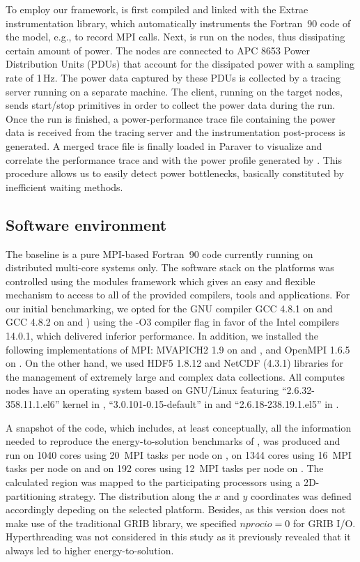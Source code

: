 To employ our framework, \cosmoart is first compiled and linked with the Extrae instrumentation library, which automatically  instruments the Fortran~90 code of the model, e.g., to record MPI calls.  Next, \cosmoart  is  run on  the  nodes,  thus dissipating  certain amount  of power. The  nodes are connected to APC 8653 Power Distribution Units (PDUs)
that account for the dissipated power with a sampling rate of 1\,Hz. The power data captured by these PDUs is collected by a \pmlib tracing server running on a separate machine. The client, running on the target nodes, sends start/stop  primitives in order to collect
the power data during the \cosmoart run. Once  the run  is finished,  a power-performance trace file containing the power data is received from the tracing server and the instrumentation post-process is generated. A merged trace file is finally loaded in Paraver to visualize and correlate the performance trace and with the power profile generated by \cosmoart. This procedure allows us to easily detect power bottlenecks, basically constituted by inefficient waiting methods.

\subsection{Software environment}
\label{subsec:3.2}

The \cosmoart  baseline is a  pure MPI-based  Fortran~90 code
currently  running  on   distributed  multi-core  systems  only.   The
software stack on the platforms was controlled using the modules
framework which gives an easy  and flexible mechanism to access to all
of the  provided compilers, tools  and applications.  For  our initial
benchmarking,   we  opted   for   the  GNU   compiler  GCC 4.8.1   on
\monch and GCC 4.8.2 on  \pilat and \tinto) using the -O3 compiler
flag  in favor  of the  Intel compilers 14.0.1,  which delivered inferior
performance.  In  addition, we installed the following implementations of MPI: MVAPICH2 1.9 on \monch and \pilat, and  OpenMPI 1.6.5 on \tinto. On the other hand, we  used HDF5 1.8.12 and NetCDF  (4.3.1) libraries for  the management  of extremely  large and
complex data collections.  All computes nodes have an operating system
based on GNU/Linux featuring ``2.6.32-358.11.1.el6'' kernel in
\monch, ``3.0.101-0.15-default'' in \pilat and ``2.6.18-238.19.1.el5'' in \tinto.

A snapshot of the code,  which includes, at least conceptually, all the
information needed  to reproduce the  energy-to-solution benchmarks of
\cosmoart, was produced and run on 1040 cores using 20~MPI
tasks  per node on  \monch, on 1344 cores  using 16~MPI
tasks per node on  \pilat and on 192 cores  using 12~MPI
tasks per node on \tinto.  The calculated region was mapped
to the participating processors using a 2D-partitioning strategy.  The
distribution along the $x$ and $y$ coordinates was defined accordingly depeding on the selected platform.
Besides,  as this  version does not  make use  of the  traditional GRIB
library, we  specified $nprocio=0$  for GRIB I/O.   Hyperthreading was
not considered in this study  as it previously revealed that it always
led to higher energy-to-solution.